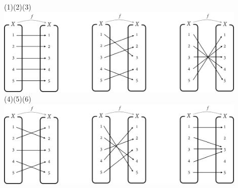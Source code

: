 \documentclass{oblivoir}
\begin{document}
%
\label{inverse17}
\begin{center}
(1)\hspace{105pt}(2)\hspace{105pt}(3)\\
\includegraphics[width=0.9\textwidth]{inverse_17-1}\\[10pt]
(4)\hspace{105pt}(5)\hspace{105pt}(6)\\
\includegraphics[width=0.9\textwidth]{inverse_17-2}
\end{center}

\end{document}
